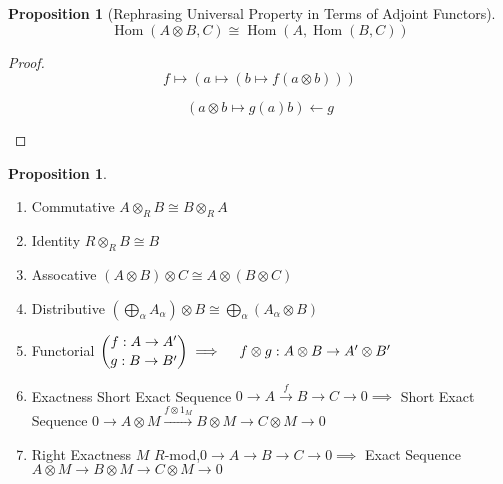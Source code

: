 \documentclass{article}
\theoremstyle{definition}
\newtheorem{proposition}[theorem]{Proposition}
\newcommand{\Hom}{\operatorname{Hom}}
\begin{document}
\begin{proposition}
    [Rephrasing Universal Property in Terms of Adjoint Functors]

    \[
        \Hom(A \otimes B, C) \cong \Hom(A, \Hom(B,C))
    \]

\end{proposition}

\begin{proof}
    \[
        f \mapsto (a \mapsto (b \mapsto f(a \otimes b)))
    \] 

    \[
        (a \otimes b \mapsto g(a)b) \leftarrow g
    \]

    \begin{center}


    \end{center}

\end{proof}

\begin{proposition}
    \begin{enumerate}[label=\arabic*)]
        \item Commutative \(A \otimes _ R B \cong B \otimes _ R A\) 
        \item Identity \(R \otimes _ R B \cong B\) 
        \item Assocative \((A \otimes B) \otimes C \cong A \otimes (B \otimes C)\) 
        \item Distributive \(\left( \bigoplus_{\alpha} A_\alpha  \right) \otimes B \cong \bigoplus_{\alpha} (A_\alpha \otimes B)\)  
        \item Functorial \(\dbinom{f:A \to A^{\prime}}{g:B\to B^{\prime}} \implies  \quad f \otimes g : A \otimes B \to A^{\prime} \otimes B^{\prime} \) 
        \item Exactness Short Exact Sequence \(0 \to A \overset{f}{\to} B \to C \to 0 \implies\) Short Exact Sequence \(0 \to A \otimes M \overset{f \otimes 1_M}{\to} B \otimes M \to C \otimes M \to 0\) 
        \item Right Exactness \(M\) \(R\)-mod,\(0 \to A \to B \to C \to 0 \implies\) Exact Sequence \(A \otimes M \to B \otimes M \to C \otimes M \to 0\)  
    \end{enumerate} 
\end{proposition}
\end{document}
